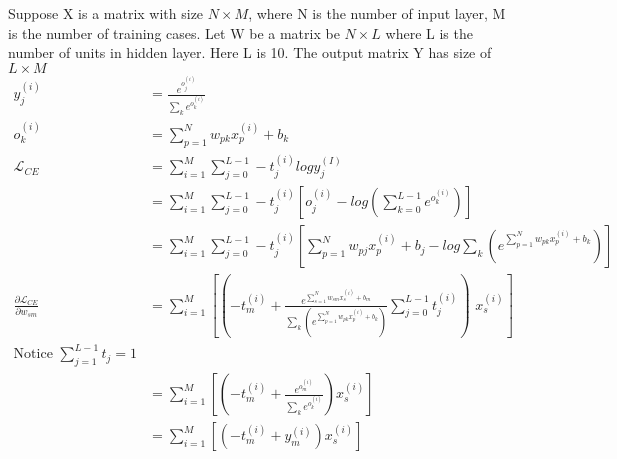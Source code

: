\documentclass[12pt]{article}
\begin{document}
Suppose X is a matrix with size $N\times M$, where N is the number of input layer, M is the number of training cases. Let W be a matrix be $N\times L$ where L is the number of units in hidden layer. Here L is 10. The output matrix Y has size of $L\times M$
\begin{align}
    y_j^{(i)} &= \frac{e^{o_j^{(i)}}}{\sum_k e^{o_k^{(i)}}}\\
    o_k^{(i)} &= \sum_{p=1}^{N}w_{pk}x_p^{(i)}+b_k\\
    \mathcal{L}_{CE} 
    &= \sum_{i=1}^M \sum_{j=0}^{L-1} -t_j^{(i)}logy_j^{(I)}\\
    &= \sum_{i=1}^M \sum_{j=0}^{L-1} -t_j^{(i)}[o_j^{(i)}-log(\sum_{k=0}^{L-1} e^{o_k^{(i)}})]\\
    &= \sum_{i=1}^M \sum_{j=0}^{L-1} -t_j^{(i)}[\sum_{p=1}^{N}w_{pj}x_p^{(i)}+b_j - log\sum_k (e^{\sum_{p=1}^{N}w_{pk}x_p^{(i)}+b_k})]\\
    \frac{\partial \mathcal{L}_{CE}}{\partial w_{sm}}
    &= \sum_{i=1}^M [(-t_m^{(i)} + \frac{e^{\sum_{s=1}^{N}w_{sm}x_s^{(i)}+b_m}}{\sum_k (e^{\sum_{p=1}^{N}w_{pk}x_p^{(i)}+b_k})}\sum_{j=0}^{L-1} t_j^{(i)})\,\,x_s^{(i)}]\\ \text{Notice $\sum_{j=1}^{L-1} t_j = 1$}\\
    &= \sum_{i=1}^M [(-t_m^{(i)} + \frac{e^{o_m^{(i)}}}{\sum_k e^{o_k^{(i)}}})x_s^{(i)}]\\
    &= \sum_{i=1}^M [(-t_m^{(i)} + y_m^{(i)})x_s^{(i)}]
\end{align}
\end{document}
